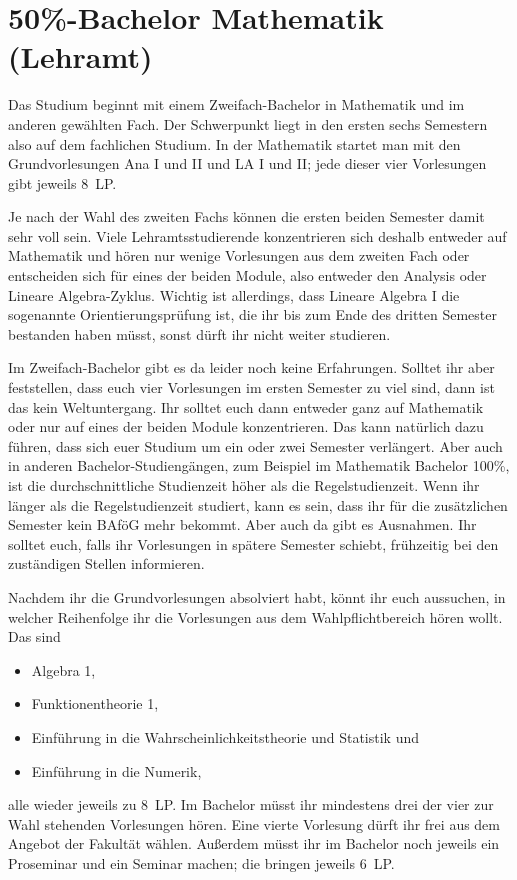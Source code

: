 \section{50\%-Bachelor Mathematik (Lehramt)}

Das Studium beginnt mit einem Zweifach-Bachelor in Mathematik und im anderen gewählten Fach. Der Schwerpunkt liegt in den ersten sechs Semestern also auf dem fachlichen Studium. In der Mathematik startet man mit den Grundvorlesungen Ana I und II und LA I und II; jede dieser vier Vorlesungen gibt jeweils 8~\gls{LP}.

Je nach der Wahl des zweiten Fachs können die ersten beiden Semester damit sehr voll sein. Viele Lehramtsstudierende konzentrieren sich deshalb entweder auf Mathematik und hören nur wenige Vorlesungen aus dem zweiten Fach oder entscheiden sich für eines der beiden Module, also entweder den Analysis oder Lineare Algebra-Zyklus. Wichtig ist allerdings, dass Lineare Algebra I die sogenannte Orientierungsprüfung ist, die ihr bis zum Ende des dritten Semester bestanden haben müsst, sonst dürft ihr nicht weiter studieren.

Im Zweifach-Bachelor gibt es da leider noch keine Erfahrungen. Solltet ihr aber feststellen, dass euch vier Vorlesungen im ersten Semester zu viel sind, dann ist das kein Weltuntergang. Ihr solltet euch dann entweder ganz auf Mathematik oder nur auf eines der beiden Module konzentrieren. Das kann natürlich dazu führen, dass sich euer Studium um ein oder zwei Semester verlängert. Aber auch in anderen Bachelor-Studiengängen, zum Beispiel im Mathematik Bachelor 100\%, ist die durchschnittliche Studienzeit höher als die Regelstudienzeit. Wenn ihr länger als die Regelstudienzeit studiert, kann es sein, dass ihr für die zusätzlichen Semester kein BAföG mehr bekommt. Aber auch da gibt es Ausnahmen. Ihr solltet euch, falls ihr Vorlesungen in spätere Semester schiebt, frühzeitig bei den zuständigen Stellen informieren.

Nachdem ihr die Grundvorlesungen absolviert habt, könnt ihr euch aussuchen, in welcher Reihenfolge ihr die Vorlesungen aus dem Wahlpflichtbereich hören wollt. Das sind
\begin{itemize}
  \item Algebra 1,
  \item Funktionentheorie 1,
  \item Einführung in die Wahrscheinlichkeitstheorie und Statistik und
  \item Einführung in die Numerik,
\end{itemize}
alle wieder jeweils zu 8~\gls{LP}. Im Bachelor müsst ihr mindestens drei der vier zur Wahl stehenden Vorlesungen hören. Eine vierte Vorlesung dürft ihr frei aus dem Angebot der Fakultät wählen. Außerdem müsst ihr im Bachelor noch jeweils ein Proseminar und ein Seminar machen; die bringen jeweils 6~\gls{LP}.

